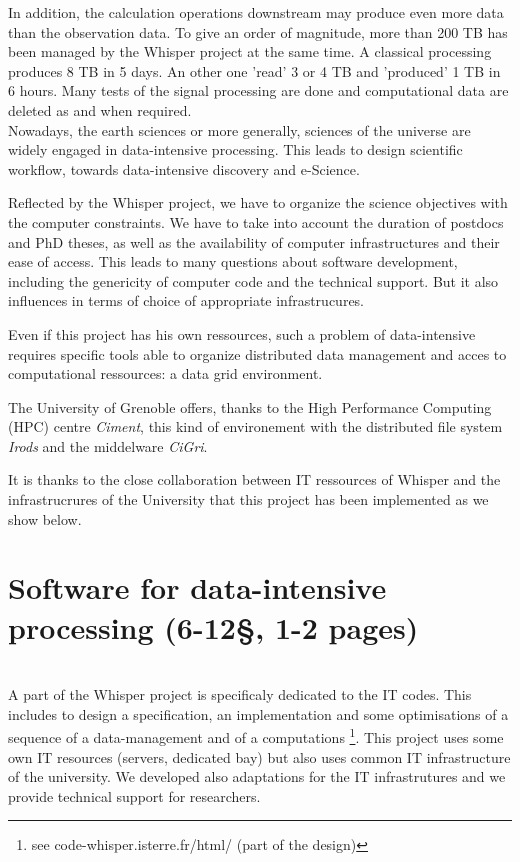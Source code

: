 \documentclass[a4paper, 10pt]{article}
\begin{document}
\begin{multicols}{2}
In addition, the calculation operations downstream may produce even more data than the observation data.
To give an order of magnitude, more than 200 TB has been managed by the Whisper project at the same time. 
A classical processing produces 8 TB in 5 days. An other one 'read' 3 or 4 TB and 'produced' 1 TB in 6 hours.
Many tests of the signal processing are done and computational data are deleted as and when required.
\\


Nowadays, the earth sciences or more generally, sciences of the universe are widely engaged in
data-intensive processing. This leads to design scientific workflow, towards data-intensive discovery and e-Science.


Reflected by the Whisper project, we have to organize the science objectives with
the computer constraints. We have to take into account 
the duration of postdocs and PhD theses, as well as the availability of computer infrastructures and their ease of access. 
This leads to many questions about software development, including the genericity of computer code and 
the technical support. But it also influences in terms of choice of appropriate infrastrucures.

Even if this project has his own ressources, such a problem of data-intensive requires specific tools able to 
organize distributed data management and acces to computational ressources: a data grid environment.

The University of Grenoble offers, thanks to the High Performance Computing (HPC) centre \emph{Ciment}, this kind of environement with the distributed file system \emph{Irods}
and the middelware \emph{CiGri}.%


It is thanks to the close collaboration between IT ressources of Whisper and the infrastrucrures of the University
that this project has been implemented as we show below.


\newpage

\section{Software for data-intensive processing (6-12\S , 1-2 pages) }
~\\

A part of the Whisper project is specificaly dedicated to the IT codes. This includes to design a specification, an implementation and some optimisations of
a sequence of a data-management and of a computations \footnote{see code-whisper.isterre.fr/html/ (part of the design)}.
This project uses some own IT resources (servers, dedicated bay) but also uses common IT infrastructure of the university.
We developed also adaptations for the IT infrastrutures and we provide technical support for researchers.


\end{multicols}
\end{document}
